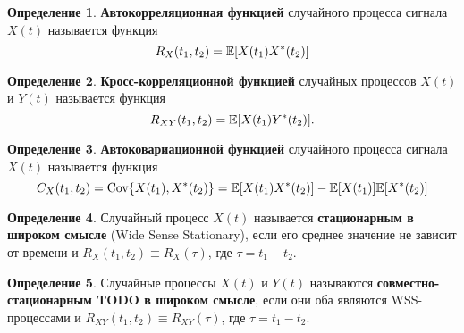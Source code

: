 \documentclass{book}
\numberwithin{theorem}{chapter}
\numberwithin{statement}{chapter}
\numberwithin{lemma}{chapter}
\theoremstyle{definition}
\numberwithin{task}{chapter}
\theoremstyle{remark}
\numberwithin{example}{chapter}
\theoremstyle{definition}
\newtheorem{definition}{Определение}
\numberwithin{definition}{chapter}
\theoremstyle{remark}
\theoremstyle{remark}
\numberwithin{lyrics}{section}
\begin{document}
\begin{definition}
	\textbf{Автокорреляционная функцией} случайного процесса сигнала $X(t)$ называется функция
	$$
	R_X(t_1, t_2) = \mathbb{E}[X(t_1)X^*(t_2)]
	$$
\end{definition}
\begin{definition}
	\textbf{Кросс-корреляционной функцией} случайных процессов $X(t)$ и $Y(t)$ называется функция
	$$
	R_{XY}(t_1, t_2) = \mathbb{E}[X(t_1)Y^*(t_2)].
	$$
\end{definition}
\begin{definition}
	\textbf{Автоковариационной функцией} случайного процесса сигнала $X(t)$ называется функция
	$$
	C_X(t_1, t_2) = \text{Cov}\{X(t_1),X^*(t_2)\} = \mathbb{E}[X(t_1)X^*(t_2)] - \mathbb{E}[X(t_1)]\mathbb{E}[X^*(t_2)]
	$$
\end{definition}

\begin{definition}
	Случайный процесс $X(t)$ называется \textbf{стационарным в широком смысле} (Wide Sense Stationary), если его среднее значение не зависит от времени и $R_{X}(t_1, t_2) \equiv R_X(\tau)$, где $\tau = t_1 - t_2$.
\end{definition}
\begin{definition}
	Случайные процессы $X(t)$ и $Y(t)$ называются \textbf{совместно-стационарным TODO в широком смысле}, если они оба являются WSS-процессами и $R_{XY}(t_1, t_2) \equiv R_{XY}(\tau)$, где $\tau = t_1 - t_2$.
\end{definition}
\end{document}

